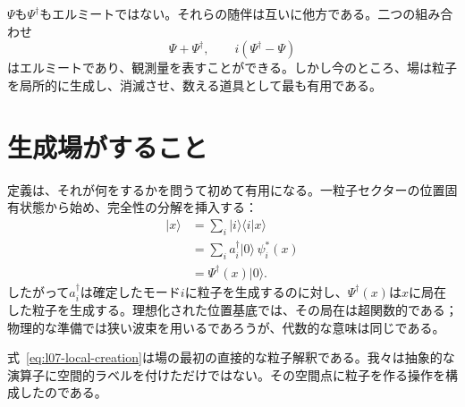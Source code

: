 \(\Psi\)も\(\Psi^\dagger\)もエルミートではない。それらの随伴は互いに他方である。二つの組み合わせ
\begin{equation}
\Psi+\Psi^\dagger,
\qquad
i(\Psi^\dagger-\Psi)
\label{eq:l07-hermitian-combinations}
\end{equation}
はエルミートであり、観測量を表すことができる。しかし今のところ、場は粒子を局所的に生成し、消滅させ、数える道具として最も有用である。

\begin{classroomqa}
\end{classroomqa}

\section{生成場がすること}

定義は、それが何をするかを問うて初めて有用になる。一粒子セクターの位置固有状態から始め、完全性の分解を挿入する：
\begin{align}
|x\rangle
&=\sum_i |i\rangle\langle i|x\rangle \\
&=\sum_i a_i^\dagger|0\rangle\,\psi_i^*(x) \\
&=\Psi^\dagger(x)|0\rangle.
\label{eq:l07-local-creation}
\end{align}
したがって\(a_i^\dagger\)は確定したモード\(i\)に粒子を生成するのに対し、\(\Psi^\dagger(x)\)は\(x\)に局在した粒子を生成する。理想化された位置基底では、その局在は超関数的である；物理的な準備では狭い波束を用いるであろうが、代数的な意味は同じである。

\begin{classroomqa}
\end{classroomqa}

式~\eqref{eq:l07-local-creation}は場の最初の直接的な粒子解釈である。我々は抽象的な演算子に空間的ラベルを付けただけではない。その空間点に粒子を作る操作を構成したのである。

\begin{classroomqa}
\end{classroomqa}

